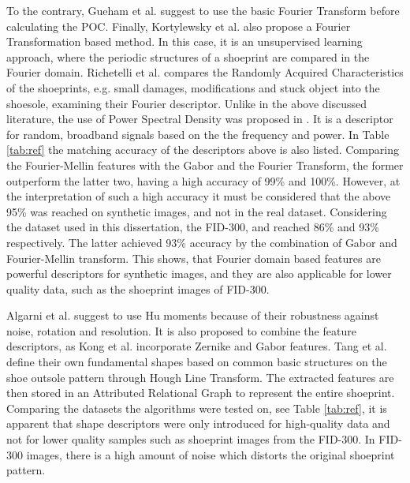 \documentclass[draft,final]{vutinfth} %
\begin{document}
To the contrary, Gueham et al. \cite{gueham2007automatic} suggest to use the basic Fourier Transform before calculating the POC.
Finally, Kortylewsky et al. \cite{kortylewski2014unsupervised} also propose a Fourier Transformation based method.
In this case, it is an unsupervised learning approach, where the periodic structures of a shoeprint are compared in the Fourier domain.
Richetelli et al. \cite{richetelli2017quantitative} compares the Randomly Acquired Characteristics of the shoeprints, e.g. small damages, modifications and stuck object into the shoesole, examining their Fourier descriptor.
Unlike in the above discussed literature, the use of Power Spectral Density was proposed in \cite{dardi2009texture}.
It is a descriptor for random, broadband signals based on the the frequency and power.
In Table \ref{tab:ref} the matching accuracy of the descriptors above is also listed.
Comparing the Fourier-Mellin features with the Gabor and the Fourier Transform, the former outperform the latter two, having a high accuracy of 99\% and 100\%.
However, at the interpretation of such a high accuracy it must be considered that the above 95\% was reached on synthetic images, and not in the real dataset.
Considering the dataset used in this dissertation, the FID-300, \cite{kortylewski2014unsupervised} and \cite{wu2019crime} reached 86\% and 93\% respectively.
The latter achieved 93\% accuracy by the combination of Gabor and Fourier-Mellin transform.
This shows, that Fourier domain based features are powerful descriptors for synthetic images, and they are also applicable for lower quality data, such as the shoeprint images of FID-300.
\par
Algarni et al. \cite{algarni2008novel} suggest to use Hu moments because of their robustness against noise, rotation and resolution.
It is also proposed to combine the feature descriptors, as Kong et al. \cite{kong2014novel} incorporate Zernike and Gabor features.
Tang et al. \cite{tang2010footwear} define their own fundamental shapes based on common basic structures on the shoe outsole pattern through Hough Line Transform. 
The extracted features are then stored in an Attributed Relational Graph to represent the entire shoeprint.
Comparing the datasets the algorithms were tested on, see Table \ref{tab:ref}, it is apparent that shape descriptors were only introduced for high-quality data and not for lower quality samples such as shoeprint images from the FID-300.
In FID-300 images, there is a high amount of noise which distorts the original shoeprint pattern.
\end{document}
